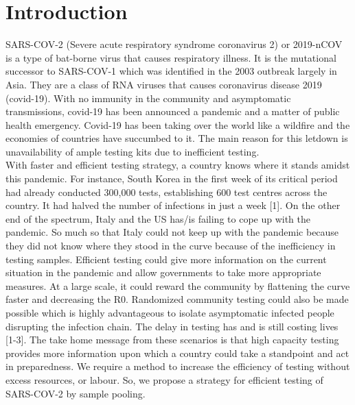 \documentclass[fleqn,10pt]{wlscirep}
\begin{document}
	\flushbottom
	
	
	\maketitle
	
	\thispagestyle{empty}
	
	\tableofcontents 
	
	\section{Introduction}
	
	SARS-COV-2 (Severe acute respiratory syndrome coronavirus 2) or 2019-nCOV is a type of bat-borne virus that causes respiratory illness. It is the mutational successor to SARS-COV-1 which was identified in the 2003 outbreak largely in Asia. They are a class of RNA viruses that causes coronavirus disease 2019 (covid-19). With no immunity in the community and asymptomatic transmissions, covid-19 has been announced a pandemic and a matter of public health emergency. Covid-19 has been taking over the world like a wildfire and the economies of countries have succumbed to it. The main reason for this letdown is unavailability of ample testing kits due to inefficient testing.\\
	
	With faster and efficient testing strategy, a country knows where it stands amidst this pandemic. For instance, South Korea in the first week of its critical period had already conducted 300,000 tests, establishing 600 test centres across the country. It had halved the number of infections in just a week [1]. On the other end of the spectrum, Italy and the US has/is failing to cope up with the pandemic. So much so that Italy could not keep up with the pandemic because they did not know where they stood in the curve because of the inefficiency in testing samples. Efficient testing could give more information on the current situation in the pandemic and allow governments to take more appropriate measures. At a large scale, it could reward the community by flattening the curve faster and decreasing the R0. Randomized community testing could also be made possible which is highly advantageous to isolate asymptomatic infected people disrupting the infection chain. The delay in testing has and is still costing lives [1-3]. The take home message from these scenarios is that high capacity testing provides more information upon which a country could take a standpoint and act in preparedness. We require a method to increase the efficiency of testing without excess resources, or labour. So, we propose a strategy for efficient testing of SARS-COV-2 by sample pooling.
	
\end{document}
